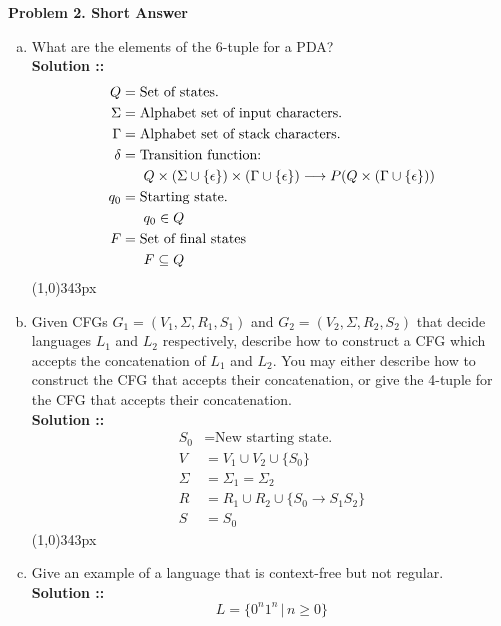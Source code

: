 \documentclass[11pt]{article}
\begin{document}
\textbf{Problem 2. Short Answer}
\begin{enumerate}[a)]
\item
What are the elements of the 6-tuple for a PDA? \\
\vspace{5px}\textbf{Solution ::}
\begin{align*}
    Q &= \text{Set of states.} \\
    \Sigma &= \text{Alphabet set of input characters.} \\
    \Gamma &= \text{Alphabet set of stack characters.} \\
    \delta &= \text{Transition function:} \\
    &\hspace{16px}Q\times (\Sigma\cup\{\epsilon\})\times (\Gamma\cup\{\epsilon\})
    \longrightarrow P(Q\times (\Gamma\cup\{\epsilon\})) \\
    q_0 &= \text{Starting state.} \\
    &\hspace{16px}q_0\in Q \\
    F &= \text{Set of final states} \\
    &\hspace{16px}F\subseteq Q
\end{align*}
\line(1,0){343px}

\item
Given CFGs $G_1 = (V_1, \Sigma, R_1, S_1)$ and $G_2 = (V_2, \Sigma ,R_2, S_2)$
that decide languages $L_1$ and $L_2$ respectively, describe how to construct
a CFG which accepts the concatenation of $L_1$ and $L_2$. You may either
describe how to construct the CFG that accepts their concatenation, or give
the 4-tuple for the CFG that accepts their concatenation. \\
\vspace{5px}\textbf{Solution ::}
\begin{align*}
    S_0 &= \text{New starting state.} \\
    V &= V_1\cup V_2\cup \{S_0\} \\
    \Sigma &= \Sigma_1 = \Sigma_2 \\
    R &= R_1 \cup R_2 \cup \{S_0\longrightarrow S_1S_2\} \\
    S &= S_0
\end{align*}
\line(1,0){343px}

\item
Give an example of a language that is context-free but not regular. \\
\vspace{5px}\textbf{Solution ::}
$$L = \{0^n1^n \,|\, n\ge 0\}$$
\end{enumerate}
\pagebreak
\end{document}
